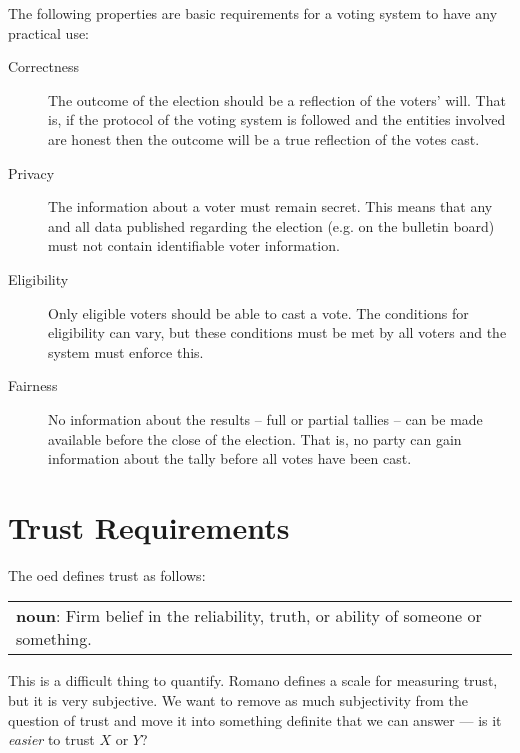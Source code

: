 The following properties are basic requirements for a voting system to have any practical use:

\begin{description}
    \item[Correctness] The outcome of the election should be a reflection of the voters' will. That is, if the protocol of the voting system is followed and the entities involved are honest then the outcome will be a true reflection of the votes cast.
    \item[Privacy] The information about a voter must remain secret. This means that any and all data published regarding the election (e.g. on the bulletin board) must not contain identifiable voter information.
    \item[Eligibility] Only eligible voters should be able to cast a vote. The conditions for eligibility can vary, but these conditions must be met by all voters and the system must enforce this.
    \item[Fairness] No information about the results -- full or partial tallies -- can be made available before the close of the election. That is, no party can gain information about the tally before all votes have been cast.
\end{description}







\section{Trust Requirements}
\label{ch:req:trust}

The \gls{oed} defines trust as follows:

\vspace{1em}
\noindent \begin{tabular}{|p{}}
    \noindent \textbf{noun}: Firm belief in the reliability, truth, or ability of someone or something.
\end{tabular}
\vspace{1em}

This is a difficult thing to quantify. Romano \cite{romano_nature_2003} defines a scale for measuring trust, but it is very subjective. We want to remove as much subjectivity from the question of trust and move it into something definite that we can answer --- is it \emph{easier} to trust $X$ or $Y$?

